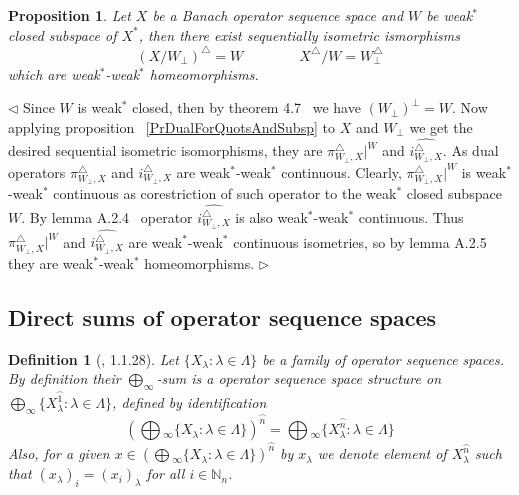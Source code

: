 \documentclass[12pt]{article}
\newtheorem{proposition}[theorem]{Proposition}
\newtheorem{definition}[theorem]{Definition}
\newenvironment{proof}{\par $\triangleleft$}{$\triangleright$}
\begin{document}
\begin{proposition}\label{PrDualForWStarClQuotsAndSubsp} Let $X$ be a Banach 
operator sequence space and $W$ be weak${}^*$ closed subspace of $X^*$, 
then there exist sequentially isometric ismorphisms
$$
{(X/W_\perp)}^\triangle= W \qquad\qquad X^\triangle/W=W_\perp^\triangle
$$
which are weak${}^*$-weak${}^*$ homeomorphisms.
\end{proposition}
\begin{proof} Since $W$ is weak${}^*$ closed, then by theorem 4.7~\cite{RudinFA}
we have  ${(W_\perp)}^\perp=W$. Now applying proposition 
~\ref{PrDualForQuotsAndSubsp} to $X$ and $W_\perp$ we get the desired sequential 
isometric isomorphisms, they are $\pi_{W_\perp,X}^\triangle|^W$ and 
$\widehat{i_{W_\perp,X}^\triangle}$. As dual operators 
$\pi_{W_\perp,X}^\triangle$ and $i_{W_\perp,X}^\triangle$ are 
weak${}^*$-weak${}^*$ continuous. Clearly, $\pi_{W_\perp,X}^\triangle|^W$ 
is weak${}^*$-weak${}^*$ continuous as corestriction of such operator to the 
weak${}^*$ closed subspace $W$. By lemma A.2.4~\cite{BleOpAlgAndMods} operator 
$\widehat{i_{W_\perp,X}^\triangle}$ is also weak${}^*$-weak${}^*$ continuous. 
Thus  $\pi_{W_\perp,X}^\triangle|^W$ and $\widehat{i_{W_\perp,X}^\triangle}$ 
are weak${}^*$-weak${}^*$ continuous isometries, so by lemma A.2.5 
~\cite{BleOpAlgAndMods} they are weak${}^*$-weak${}^*$ homeomorphisms.
\end{proof}

























\subsection{Direct sums of operator sequence spaces}

\begin{definition}[\cite{LamOpFolgen}, 1.1.28]\label{DefSQProd}
Let $ \{X_\lambda: \lambda \in \Lambda \}$ be a family of operator sequence 
spaces. By definition their $\bigoplus_\infty$-sum is a operator sequence 
space structure on 
$\bigoplus_\infty \{X_\lambda^{\wideparen{1}}:\lambda\in \Lambda \}$, defined 
by identification
$$
{\left(
    \bigoplus{}_\infty \{X_\lambda:\lambda \in \Lambda \}
\right)}^{\wideparen{n}}
=\bigoplus{}_\infty \{X_\lambda^{\wideparen{n}}:\lambda\in \Lambda \}
$$
Also, for a given 
$x\in {\left(
    \bigoplus{}_\infty \{X_\lambda:\lambda \in \Lambda \}
\right)}^{\wideparen{n}}$ 
by $x_\lambda$ we denote element of 
$X_\lambda^{\wideparen{n}}$ such that 
${(x_\lambda)}_i={(x_i)}_\lambda$ for all $i\in\mathbb{N}_n$.
\end{definition}
\end{document}
